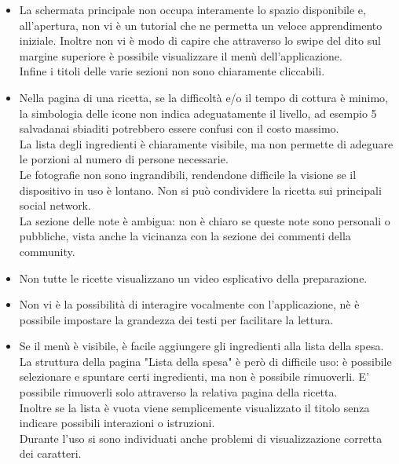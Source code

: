 \begin{itemize}
\item La schermata principale non occupa interamente lo spazio disponibile e, all'apertura, non vi è un tutorial che ne permetta un veloce apprendimento iniziale. Inoltre non vi è modo di capire che attraverso lo swipe del dito sul margine superiore è possibile visualizzare il menù dell'applicazione.\\ Infine i titoli delle varie sezioni non sono chiaramente cliccabili.

\item Nella pagina di una ricetta, se la difficoltà e/o il tempo di cottura è minimo, la simbologia delle icone non indica adeguatamente il livello, ad esempio 5 salvadanai sbiaditi potrebbero essere confusi con il costo massimo.\\
La lista degli ingredienti è chiaramente visibile, ma non permette di adeguare le porzioni al numero di persone necessarie.\\
Le fotografie non sono ingrandibili, rendendone difficile la visione se il dispositivo in uso è lontano. Non si può condividere la ricetta sui principali social network.\\La sezione delle note è ambigua: non è chiaro se queste note sono personali o pubbliche, vista anche la vicinanza con la sezione dei commenti della community.

\item Non tutte le ricette visualizzano un video esplicativo della preparazione.

\item Non vi è la possibilità di interagire vocalmente con l'applicazione, nè è possibile impostare la grandezza dei testi per facilitare la lettura.

\item Se il menù è visibile, è facile aggiungere gli ingredienti alla lista della spesa. La struttura della pagina "Lista della spesa" è però di difficile uso: è possibile selezionare e spuntare certi ingredienti, ma non è possibile rimuoverli. E' possibile rimuoverli solo attraverso la relativa pagina della ricetta.\\Inoltre se la lista è vuota viene semplicemente visualizzato il titolo senza indicare possibili interazioni o istruzioni.\\
Durante l'uso si sono individuati anche problemi di visualizzazione corretta dei caratteri.


\end{itemize}
